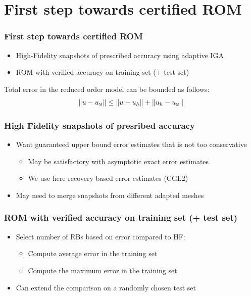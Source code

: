 \documentclass{beamer}
\begin{document}
\section{First step towards certified ROM}

\begin{frame}
  \frametitle{First step towards certified ROM}
  \begin{itemize}
  \item High-Fidelity snapshots of prescribed accuracy using adaptive IGA
  \item ROM with verified accuracy on training set (+ test set)
  \end{itemize}

  \vspace{1cm}
  Total error in the reduced order model can be bounded as follows:
  \begin{equation}
    \|u-u_\textsc{m}\| \leq \|u-u_h\| + \|u_h-u_\textsc{m}\|
    \nonumber
  \end{equation}
\end{frame}

\begin{frame}
  \frametitle{High Fidelity snapshots of presribed accuracy}

  \begin{itemize}
  \item Want guaranteed upper bound error estimates that is not too conservative
    \begin{itemize}
    \item May be satisfactory with asymptotic exact error estimates
    \item We use here recovery based error estimates (CGL2)
    \end{itemize}
  \item May need to merge snapshots from different adapted meshes
  \end{itemize}
\end{frame}

\begin{frame}
  \frametitle{ROM with verified accuracy on training set (+ test set)}
  \begin{itemize}
  \item Select number of RBs based on error compared to HF:
    \begin{itemize}
    \item Compute average error in the training set
    \item Compute the maximum error in the training set
    \end{itemize}
  \item Can extend the comparison on a randomly chosen test set
  \end{itemize}
\end{frame}
\end{document}
